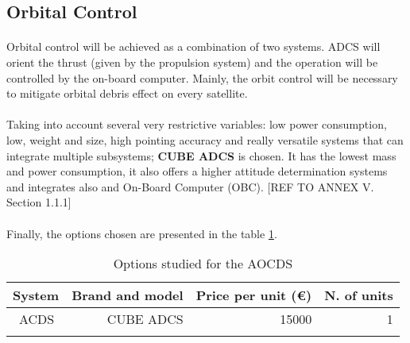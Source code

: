 \subsection{Orbital Control}
\paragraph{}Orbital control will be achieved as a combination of two systems. ADCS will orient the thrust (given by the propulsion system) and the operation will be controlled by the on-board computer. Mainly, the orbit control will be necessary to mitigate orbital debris effect on every satellite.

\paragraph{} Taking into account several very restrictive variables: low power consumption, low, weight and size, high pointing accuracy and really versatile systems that can integrate multiple subsystems; \textbf{CUBE ADCS} is chosen. It has the lowest mass and power consumption, it also offers a higher attitude determination systems and integrates also and On-Board Computer (OBC). [{REF TO ANNEX V. Section 1.1.1}]

\paragraph{}Finally, the options chosen are presented in the table \ref{epsfinal}.

\begin{longtable}{| l | r | r | r | }
\hline
\rowcolor[gray]{0.80}	\textbf{System} &  \textbf{Brand and model}     & \textbf{Price per unit (\euro)}  & \textbf{N. of units}  \\
\hline
\endfirsthead

	   ~ACDS & CUBE ADCS & 15000 & 1\\
	\hline

\caption{Options studied for the AOCDS}
\label{epsfinal}
\end{longtable}


